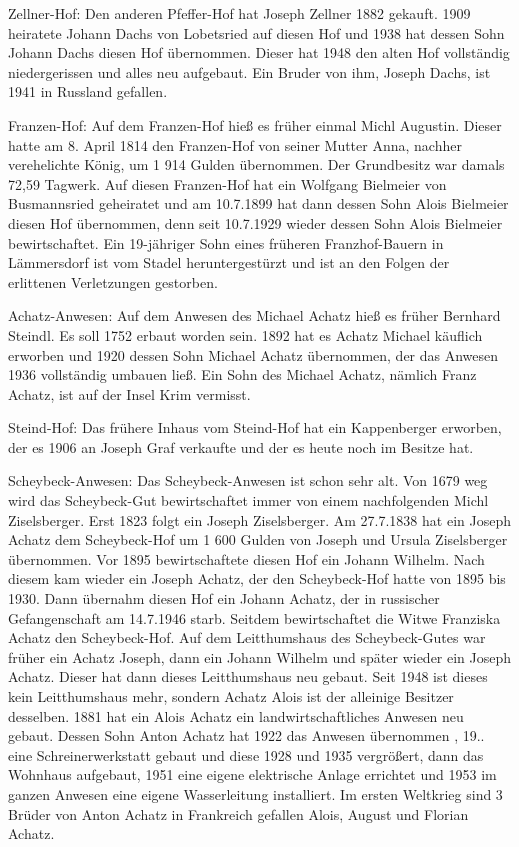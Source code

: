 Zellner-Hof: Den anderen Pfeffer-Hof hat Joseph Zellner 1882 gekauft. 1909
heiratete Johann Dachs von Lobetsried auf diesen Hof und 1938 hat dessen Sohn
Johann Dachs diesen Hof übernommen. Dieser hat 1948 den alten Hof vollständig
niedergerissen und alles neu aufgebaut. Ein Bruder von ihm, Joseph Dachs, ist
1941 in Russland gefallen.

Franzen-Hof: Auf dem Franzen-Hof hieß es früher einmal Michl Augustin. Dieser
hatte am 8. April 1814 den Franzen-Hof von seiner Mutter Anna, nachher
verehelichte König, um 1 914 Gulden übernommen. Der Grundbesitz war damals 72,59
Tagwerk. Auf diesen Franzen-Hof hat ein Wolfgang Bielmeier von Busmannsried
geheiratet und am 10.7.1899 hat dann dessen Sohn Alois Bielmeier diesen Hof
übernommen, denn seit 10.7.1929 wieder dessen Sohn Alois Bielmeier
bewirtschaftet. Ein 19-jähriger Sohn eines früheren Franzhof-Bauern in
Lämmersdorf ist vom Stadel heruntergestürzt und ist an den Folgen der erlittenen
Verletzungen gestorben.

Achatz-Anwesen: Auf dem Anwesen des Michael Achatz hieß es früher Bernhard
Steindl. Es soll 1752 erbaut worden sein. 1892 hat es Achatz Michael käuflich
erworben und 1920 dessen Sohn Michael Achatz übernommen, der das Anwesen 1936
vollständig umbauen ließ. Ein Sohn des Michael Achatz, nämlich Franz Achatz, ist
auf der Insel Krim vermisst.

Steind-Hof: Das frühere Inhaus vom Steind-Hof hat ein Kappenberger erworben, der
es 1906 an Joseph Graf verkaufte und der es heute noch im Besitze hat.

Scheybeck-Anwesen: Das Scheybeck-Anwesen ist schon sehr alt. Von 1679 weg wird
das Scheybeck-Gut bewirtschaftet immer von einem nachfolgenden Michl
Ziselsberger. Erst 1823 folgt ein Joseph Ziselsberger. Am 27.7.1838 hat ein
Joseph Achatz dem Scheybeck-Hof um 1 600 Gulden von Joseph und Ursula
Ziselsberger übernommen. Vor 1895 bewirtschaftete diesen Hof ein Johann Wilhelm.
Nach diesem kam wieder ein Joseph Achatz, der den Scheybeck-Hof hatte von 1895
bis 1930. Dann übernahm diesen Hof ein Johann Achatz, der in russischer
Gefangenschaft am 14.7.1946 starb. Seitdem bewirtschaftet die Witwe Franziska
Achatz den Scheybeck-Hof. Auf dem Leitthumshaus des Scheybeck-Gutes war früher
ein Achatz Joseph, dann ein Johann Wilhelm und später wieder ein Joseph Achatz.
Dieser hat dann dieses Leitthumshaus neu gebaut. Seit 1948 ist dieses kein
Leitthumshaus mehr, sondern Achatz Alois ist der alleinige Besitzer desselben.
1881 hat ein Alois Achatz ein landwirtschaftliches Anwesen neu gebaut. Dessen
Sohn Anton Achatz hat 1922 das Anwesen übernommen , 19.. eine Schreinerwerkstatt
gebaut und diese 1928 und 1935 vergrößert, dann das Wohnhaus aufgebaut, 1951
eine eigene elektrische Anlage errichtet und 1953 im ganzen Anwesen eine eigene
Wasserleitung installiert. Im ersten Weltkrieg sind 3 Brüder von Anton Achatz in
Frankreich gefallen Alois, August und Florian Achatz.

